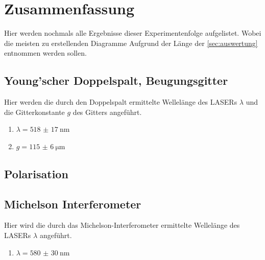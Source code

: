 \documentclass[12pt,english,ngerman]{scrartcl}
\begin{document}
\section{Zusammenfassung}\label{sec:zusammenfassung}

Hier werden nochmals alle Ergebnisse dieser Experimentenfolge aufgelistet.
Wobei die meisten zu erstellenden Diagramme Aufgrund der Länge der
\autoref{sec:auswertung} entnommen werden sollen.

\subsection{Young'scher Doppelspalt, Beugungsgitter}

Hier werden die durch den Doppelspalt ermittelte Wellelänge des LASERs
$\lambda$ und die Gitterkonstante $g$ des Gitters angeführt.

\begin{enumerate}
	\item $\lambda = \SI{518(17)}{\nm}$
	\item $g = \SI{115(6)}{\um}$
\end{enumerate}

\subsection{Polarisation}

\subsection{Michelson Interferometer}
Hier wird die durch das Michelson-Interferometer ermittelte Wellelänge des LASERs
$\lambda$ angeführt.
\begin{enumerate}
	\item $\lambda = \SI{580(30)}{\nm}$
\end{enumerate}

\newpage
\printbibliography
\listoffigures
\listoftables
\end{document}
